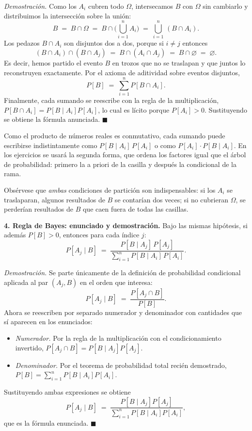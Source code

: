 \documentclass[11pt]{article}
\begin{document}
\begin{teo}
\emph{Demostraci\'on.} Como los $A_i$ cubren todo $\Omega$, intersecamos $B$ con $\Omega$ sin cambiarlo y distribuimos la intersecci\'on sobre la uni\'on:
\[
B\;=\;B\cap\Omega\;=\;B\cap\Big(\bigcup_{i=1}^{n}A_i\Big)\;=\;\bigcup_{i=1}^{n}\,(B\cap A_i).
\]
Los pedazos $B\cap A_i$ son disjuntos dos a dos, porque si $i\neq j$ entonces
\[
(B\cap A_i)\cap(B\cap A_j)\;=\;B\cap(A_i\cap A_j)\;=\;B\cap\varnothing\;=\;\varnothing .
\]
Es decir, hemos partido el evento $B$ en trozos que no se traslapan y que juntos lo reconstruyen exactamente. Por el axioma de aditividad sobre eventos disjuntos,
\[
P[B]\;=\;\sum_{i=1}^{n}P[B\cap A_i].
\]
Finalmente, cada sumando se reescribe con la regla de la multiplicaci\'on, $P[B\cap A_i]=P[B\mid A_i]P[A_i]$, lo cual es l\'icito porque $P[A_i]>0$. Sustituyendo se obtiene la f\'ormula anunciada. $\blacksquare$

\medskip
Como el producto de n\'umeros reales es conmutativo, cada sumando puede escribirse indistintamente como $P[B\mid A_i]\,P[A_i]$ o como $P[A_i]\cdot P[B\mid A_i]$. En los ejercicios se usar\'a la segunda forma, que ordena los factores igual que el \'arbol de probabilidad: primero la a priori de la casilla y despu\'es la condicional de la rama.

\medskip
Obs\'ervese que \emph{ambas} condiciones de partici\'on son indispensables: si los $A_i$ se traslaparan, algunos resultados de $B$ se contar\'ian dos veces; si no cubrieran $\Omega$, se perder\'ian resultados de $B$ que caen fuera de todas las casillas.

\medskip
\textbf{4. Regla de Bayes: enunciado y demostraci\'on.}
Bajo las mismas hip\'otesis, si adem\'as $P[B]>0$, entonces para cada \'indice $j$:
\[
P[A_j\mid B]\;=\;\frac{P[B\mid A_j]\,P[A_j]}{\displaystyle\sum_{i=1}^{n}P[B\mid A_i]\,P[A_i]} .
\]

\emph{Demostraci\'on.} Se parte \'unicamente de la definici\'on de probabilidad condicional aplicada al par $(A_j,B)$ en el orden que interesa:
\[
P[A_j\mid B]\;=\;\frac{P[A_j\cap B]}{P[B]} .
\]
Ahora se reescriben por separado numerador y denominador con cantidades que s\'i aparecen en los enunciados:
\begin{itemize}[leftmargin=1.4em]
  \item \emph{Numerador.} Por la regla de la multiplicaci\'on con el condicionamiento invertido, $P[A_j\cap B]=P[B\mid A_j]P[A_j]$.
  \item \emph{Denominador.} Por el teorema de probabilidad total reci\'en demostrado, $P[B]=\sum_{i=1}^{n}P[B\mid A_i]P[A_i]$.
\end{itemize}
Sustituyendo ambas expresiones se obtiene
\[
P[A_j\mid B]\;=\;\frac{P[B\mid A_j]P[A_j]}{\sum_{i=1}^{n}P[B\mid A_i]P[A_i]},
\]
que es la f\'ormula enunciada. $\blacksquare$


\end{teo}
\end{document}
